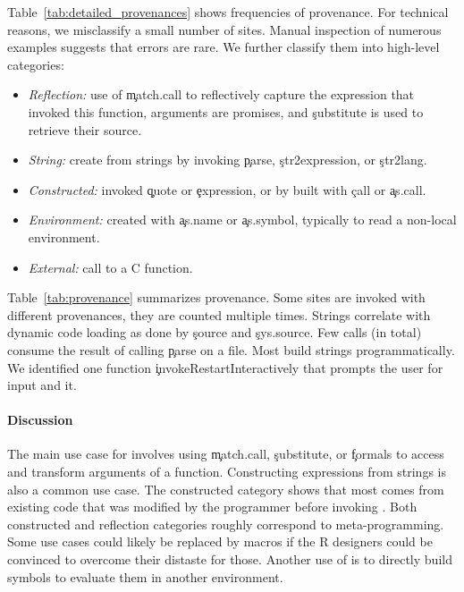 \documentclass[screen,acmsmall]{acmart}%
\begin{document}
Table~\ref{tab:detailed_provenances} shows frequencies of provenance. For
technical reasons, we misclassify a small number of sites. Manual inspection of
numerous examples suggests that errors are rare. We further classify them into
high-level categories:

\begin{itemize}[---]
\item {\it Reflection:} use of \c{match.call} to reflectively capture the
  expression that invoked this function, arguments are promises, and
  \c{substitute} is used to retrieve their source.
\item {\it String:} create from strings by invoking \c{parse},
  \c{str2expression}, or \c{str2lang}.
\item {\it Constructed:} invoked \c{quote} or \c{expression}, or by built with
  \c{call} or \c{as.call}.
\item {\it Environment: } created with \c{as.name} or \c{as.symbol}, typically
  to read a non-local environment.
\item {\it External: }  call to a C function. %
\end{itemize}

Table~\ref{tab:provenance} summarizes provenance. Some sites are invoked with
different provenances, they are counted multiple times. Strings correlate with
dynamic code loading as done by \c{source} and \c{sys.source}. Few calls
(\packageNbParseFromFileSites in total) consume the result of calling \c{parse}
on a file. Most build strings programmatically. We identified one function
\c{invokeRestartInteractively} that prompts the user for input and \evals it.




\paragraph{Discussion}
The main use case for \eval involves using \c{match.call}, \c{substitute}, or
\c{formals} to access and transform arguments of a function. Constructing
expressions from strings is also a common use case. The constructed category
shows that most \evals comes from existing code that was modified by the
programmer before invoking \eval. Both constructed and reflection categories
roughly correspond to meta-programming. Some use cases could likely be replaced
by macros if the R designers could be convinced to overcome their distaste for
those. Another use of \eval is to directly build symbols to evaluate them in
another environment.
\end{document}
